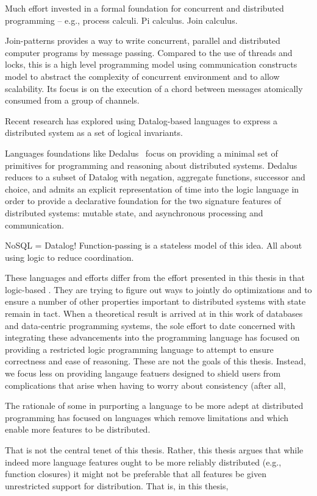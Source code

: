 Much effort invested in a formal foundation for concurrent and distributed
programming -- e.g., process calculi. Pi calculus. Join calculus.

Join-patterns provides a way to write concurrent, parallel and distributed
computer programs by message passing. Compared to the use of threads and locks,
this is a high level programming model using communication constructs model to
abstract the complexity of concurrent environment and to allow scalability. Its
focus is on the execution of a chord between messages atomically consumed from a
group of channels.

Recent research has explored using Datalog-based languages to express a
distributed system as a set of logical invariants.

Languages foundations like Dedalus~\cite{Dedalus} focus on providing a minimal set of
primitives for programming and reasoning about distributed systems. Dedalus
reduces to a subset of Datalog with negation, aggregate functions,
successor and choice, and admits an explicit representation of time into the
logic language in order to provide a declarative foundation for the two
signature features of distributed systems: mutable state, and asynchronous
processing and communication.

NoSQL = Datalog! Function-passing is a stateless model of this idea. All about
using logic to reduce coordination.

These languages and efforts differ from the effort presented in this thesis in
that logic-based . They are trying to figure out ways to jointly do
optimizations and to ensure a number of other properties important to
distributed systems with state remain in tact. When a theoretical result is
arrived at in this work of databases and data-centric programming systems, the
sole effort to date concerned with integrating these advancements into the
programming language has focused on providing a restricted logic programming
language to attempt to ensure correctness and ease of reasoning. These are not
the goals of this thesis. Instead, we focus less on providing langauge featuers designed to shield users from complications that arise when having to worry about consistency (after all,


The rationale of some in purporting a language to be more adept at distributed
programming has focused on languages which remove limitations and which enable
more features to be distributed.

That is not the central tenet of this thesis. Rather, this thesis argues that
while indeed more language features ought to be more reliably distributed (e.g.,
function closures) it might not be preferable that all features be given
unrestricted support for distribution. That is, in this thesis,

